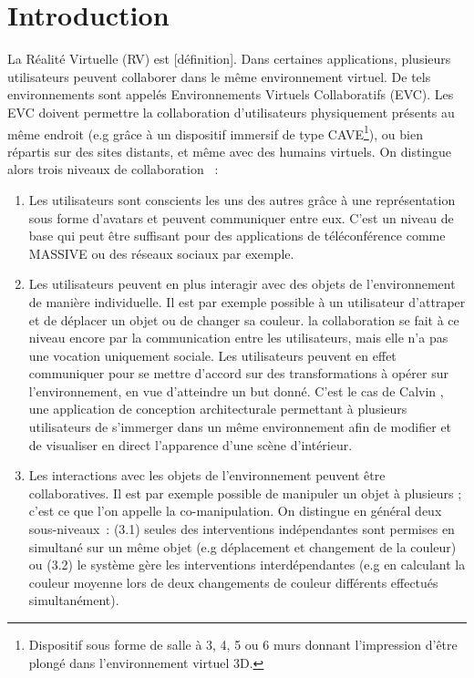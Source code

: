 \documentclass[11pt]{article}
\begin{document}
\section{Introduction}


La Réalité Virtuelle (RV) est [définition]. Dans certaines applications, plusieurs utilisateurs peuvent collaborer dans le même environnement virtuel. De tels environnements sont appelés Environnements Virtuels Collaboratifs (EVC). Les EVC doivent permettre la collaboration d'utilisateurs physiquement présents au même endroit (e.g grâce à un dispositif immersif de type CAVE\footnote{Dispositif sous forme de salle à 3, 4, 5 ou 6 murs donnant l'impression d'être plongé dans l'environnement virtuel 3D.}), ou bien répartis sur des sites distants, et même avec des humains virtuels. On distingue alors trois niveaux de collaboration \cite{margery}~:
\begin{enumerate}
	\item Les utilisateurs sont conscients les uns des autres grâce à une représentation sous forme d'avatars et peuvent communiquer entre eux. C'est un niveau de base qui peut être suffisant pour des applications de téléconférence comme MASSIVE \cite{massive} ou des réseaux sociaux par exemple.
	\item Les utilisateurs peuvent en plus interagir avec des objets de l'environnement de manière individuelle. Il est par exemple possible à un utilisateur d'attraper et de déplacer un objet ou de changer sa couleur. la collaboration se fait à ce niveau encore par la communication entre les utilisateurs, mais elle n'a pas une vocation uniquement sociale. Les utilisateurs peuvent en effet communiquer pour se mettre d'accord sur des transformations à opérer sur l'environnement, en vue d'atteindre un but donné. C'est le cas de Calvin \cite{calvin}, une application de conception architecturale permettant à plusieurs utilisateurs de s'immerger dans un même environnement afin de modifier et de visualiser en direct l'apparence d'une scène d'intérieur.
	\item Les interactions avec les objets de l'environnement peuvent être collaboratives. Il est par exemple possible de manipuler un objet à plusieurs ; c'est ce que l'on appelle la co-manipulation. On distingue en général deux sous-niveaux~: (3.1) seules des interventions indépendantes sont permises en simultané sur un même objet (e.g déplacement et changement de la couleur) ou (3.2) le système gère les interventions interdépendantes (e.g en calculant la couleur moyenne lors de deux changements de couleur différents effectués simultanément).
\end{enumerate}
\end{document}
